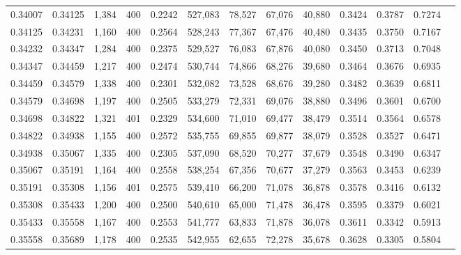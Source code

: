 \begin{tabular}{rrrrrrrrrrrrr}
0.34007 & 0.34125 &  1,384 & 400 &                                     0.2242 & 527,083 &  78,527 &  67,076 &  40,880 & 0.3424 & 0.3787 & 0.7274 \\
0.34125 & 0.34231 &  1,160 & 400 &                                     0.2564 & 528,243 &  77,367 &  67,476 &  40,480 & 0.3435 & 0.3750 & 0.7167 \\
0.34232 & 0.34347 &  1,284 & 400 &                                     0.2375 & 529,527 &  76,083 &  67,876 &  40,080 & 0.3450 & 0.3713 & 0.7048 \\
0.34347 & 0.34459 &  1,217 & 400 &                                     0.2474 & 530,744 &  74,866 &  68,276 &  39,680 & 0.3464 & 0.3676 & 0.6935 \\
0.34459 & 0.34579 &  1,338 & 400 &                                     0.2301 & 532,082 &  73,528 &  68,676 &  39,280 & 0.3482 & 0.3639 & 0.6811 \\
0.34579 & 0.34698 &  1,197 & 400 &                                     0.2505 & 533,279 &  72,331 &  69,076 &  38,880 & 0.3496 & 0.3601 & 0.6700 \\
0.34698 & 0.34822 &  1,321 & 401 &                                     0.2329 & 534,600 &  71,010 &  69,477 &  38,479 & 0.3514 & 0.3564 & 0.6578 \\
0.34822 & 0.34938 &  1,155 & 400 &                                     0.2572 & 535,755 &  69,855 &  69,877 &  38,079 & 0.3528 & 0.3527 & 0.6471 \\
0.34938 & 0.35067 &  1,335 & 400 &                                     0.2305 & 537,090 &  68,520 &  70,277 &  37,679 & 0.3548 & 0.3490 & 0.6347 \\
0.35067 & 0.35191 &  1,164 & 400 &                                     0.2558 & 538,254 &  67,356 &  70,677 &  37,279 & 0.3563 & 0.3453 & 0.6239 \\
0.35191 & 0.35308 &  1,156 & 401 &                                     0.2575 & 539,410 &  66,200 &  71,078 &  36,878 & 0.3578 & 0.3416 & 0.6132 \\
0.35308 & 0.35433 &  1,200 & 400 &                                     0.2500 & 540,610 &  65,000 &  71,478 &  36,478 & 0.3595 & 0.3379 & 0.6021 \\
0.35433 & 0.35558 &  1,167 & 400 &                                     0.2553 & 541,777 &  63,833 &  71,878 &  36,078 & 0.3611 & 0.3342 & 0.5913 \\
0.35558 & 0.35689 &  1,178 & 400 &                                     0.2535 & 542,955 &  62,655 &  72,278 &  35,678 & 0.3628 & 0.3305 & 0.5804 \\

\end{tabular}
